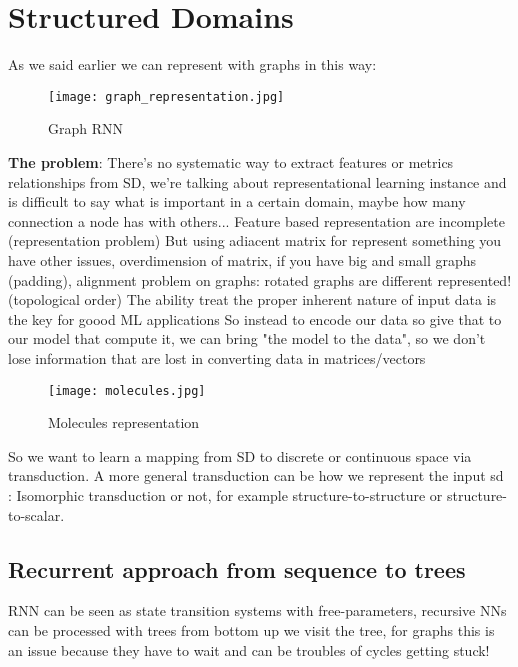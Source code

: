\documentclass[12pt]{book}
\begin{document}
\section{Structured Domains}

As we said earlier we can represent with graphs in this way:

\begin{figure}[h!]
	\centering
	\texttt{[image: graph\_representation.jpg]}
	\caption{Graph RNN}
	\label{fig:graph_rnn}
\end{figure}

\textbf{The problem}: There's no systematic way to extract features or metrics relationships from SD, we're talking about representational learning instance and is difficult to say what is important in a certain domain, maybe how many connection a node has with others...\newline
Feature based representation are incomplete (representation problem)
But using adiacent matrix for represent something you have other issues, overdimension of matrix, if you have big and small graphs (padding), alignment problem on graphs: rotated graphs are different represented! (topological order)\newline
The ability treat the proper inherent nature of input data is the key for goood ML applications\newline
\newline\newline
So instead to encode our data so give that to our model that compute it, we can bring "the model to the data", so we don't lose information that are lost in converting data in matrices/vectors

\begin{figure}[h!]
	\centering
	\texttt{[image: molecules.jpg]}
	\caption{Molecules representation}
	\label{fig:molecules}
\end{figure}
So we want to learn a mapping from SD to discrete or continuous space via transduction.
A more general transduction can be how we represent the input sd : Isomorphic transduction or not, for example structure-to-structure or structure-to-scalar.

\clearpage

\subsection{Recurrent approach from sequence to trees}
RNN can be seen as state transition systems with free-parameters, recursive NNs can be processed with trees from bottom up we visit the tree, for graphs this is an issue because they have to wait and can be troubles of cycles getting stuck!
\end{document}
